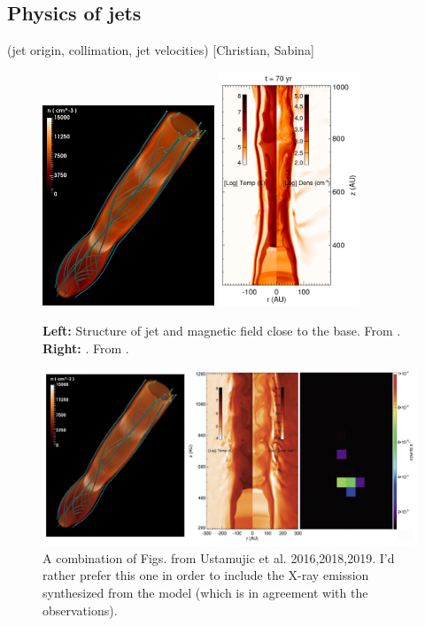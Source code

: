 \subsection{Physics of jets}
{\color{blue}(jet origin, collimation, jet velocities) [Christian, Sabina]}



\begin{figure}[t]
\centering

\includegraphics[height=6cm]{figs/diamond}
 \includegraphics[height=7cm]{figs/diamond_simu}

\caption{{\bf Left: } Structure of jet and magnetic field close to the base. From \citet{Ustamujic_2016}.
         {\bf Right: }. From \citet{Ustamujic_2018}. \label{fig:jet_simu}}
\end{figure}

\begin{figure}
    \centering
    \includegraphics[width=12cm]{figs/ustamujic.png}
    \caption{A combination of Figs. from Ustamujic et al. 2016,2018,2019. I'd rather prefer this one in order to include the X-ray emission synthesized from the model (which is in agreement with the observations).}
    \label{fig:ustamujic}
\end{figure}

